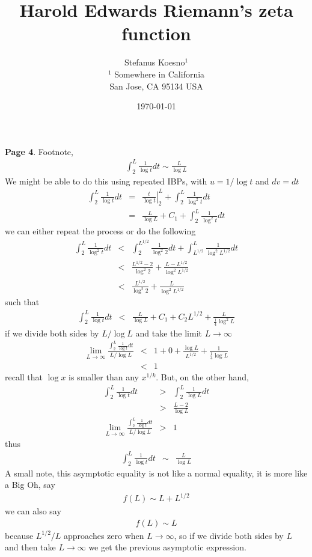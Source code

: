 \documentclass[aps,preprint,preprintnumbers,nofootinbib,showpacs,prd]{revtex4-1}
\newcommand{\nbea}{\begin{eqnarray*}}
\newcommand{\neea}{\end{eqnarray*}}
\begin{document}
\title{Harold Edwards Riemann's zeta function}
\bigskip
\author{Stefanus Koesno$^1$\\
$^1$ Somewhere in California\\ San Jose, CA 95134 USA\\
}
%
\date{\today}
%
\begin{abstract}

\end{abstract}
%
\maketitle

\renewcommand{\theequation}{A.\arabic{equation}}  %
\setcounter{equation}{0}  %

{\bf Page 4}. Footnote, 
%
\nbea
\int_2^L \frac{1}{\log t}dt \sim \frac{L}{\log L}
\neea
%
We might be able to do this using repeated IBPs, with $u = 1/\log t$ and $dv = dt$
%
\nbea
\int_2^L \frac{1}{\log t}dt & = & \left. \frac{t}{\log t}\right|_{2}^{L} + \int_2^L \frac{1}{\log^2 t}dt \\
& = & \frac{L}{\log L} + C_1 + \int_2^L \frac{1}{\log^2 t}dt
\neea
%
we can either repeat the process or do the following
%
\nbea
\int_2^L \frac{1}{\log^2 t}dt & < & \int_2^{L^{1/2}} \frac{1}{\log^2 2}dt + \int_{L^{1/2}}^L \frac{1}{\log^2 L^{1/2}}dt \\
& < & \frac{L^{1/2} - 2}{\log^2 2}  + \frac{L-L^{1/2}}{\log^2 L^{1/2}} \\
& < & \frac{L^{1/2}}{\log^2 2}  + \frac{L}{\log^2 L^{1/2}}
\neea
%
such that
%
\nbea
\int_2^L \frac{1}{\log t}dt & < & \frac{L}{\log L} + C_1 + C_2 L^{1/2} + \frac{L}{\frac{1}{4}\log^2 L}
\neea
%
if we divide both sides by $L/\log L$ and take the limit $L\to\infty$
%
\nbea
\lim_{L\to\infty} \frac{\int_2^L \frac{1}{\log t}dt}{L/\log L} & < & 1 + 0 + \frac{\log L}{L^{1/2}} + \frac{1}{\frac{1}{4}\log L} \\
& < & 1
\neea
%
recall that $\log x$ is smaller than any $x^{1/k}$. But, on the other hand,
%
\nbea
\int_2^L \frac{1}{\log t}dt & > & \int_2^L \frac{1}{\log L}dt \\
& > & \frac{L-2}{\log L} \\
\lim_{L\to\infty} \frac{\int_2^L \frac{1}{\log t}dt}{L/\log L} & > & 1 
\neea
%
thus
%
\nbea
\int_2^L \frac{1}{\log t}dt & \sim & \frac{L}{\log L}
\neea
%
A small note, this asymptotic equality is not like a normal equality, it is more like a Big Oh, say
%
\nbea
f(L) \sim L + L^{1/2}
\neea
%
we can also say
%
\nbea
f(L) \sim L
\neea
%
because $L^{1/2}/L$ approaches zero when $L\to\infty$, so if we divide both sides by $L$ and then take $L\to\infty$ we get the previous asymptotic expression.
\end{document}

